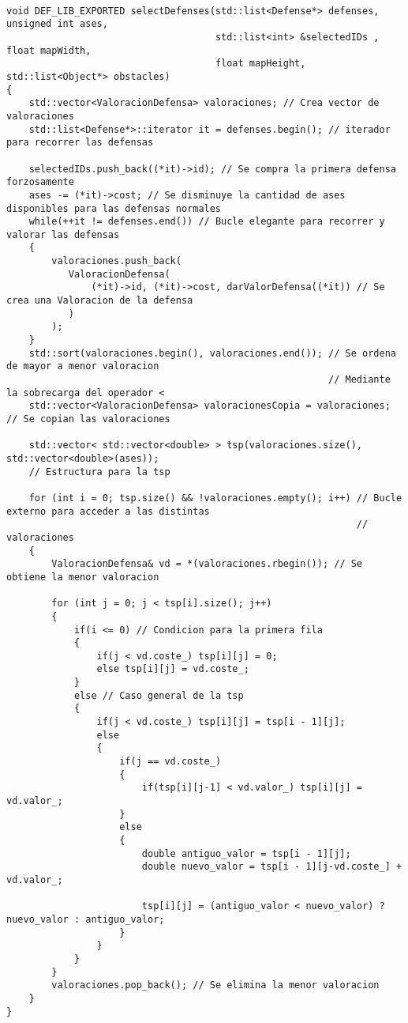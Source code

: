 \lstset{language=C++, texcl=true}
\begin{lstlisting}[frame=single]

void DEF_LIB_EXPORTED selectDefenses(std::list<Defense*> defenses, unsigned int ases,
                                     std::list<int> &selectedIDs , float mapWidth,
                                     float mapHeight, std::list<Object*> obstacles)
{
    std::vector<ValoracionDefensa> valoraciones; // Crea vector de valoraciones
    std::list<Defense*>::iterator it = defenses.begin(); // iterador para recorrer las defensas
    
    selectedIDs.push_back((*it)->id); // Se compra la primera defensa forzosamente
    ases -= (*it)->cost; // Se disminuye la cantidad de ases disponibles para las defensas normales
    while(++it != defenses.end()) // Bucle elegante para recorrer y valorar las defensas
    {
        valoraciones.push_back(
           ValoracionDefensa(
               (*it)->id, (*it)->cost, darValorDefensa((*it)) // Se crea una Valoracion de la defensa
           )
        );
    }
    std::sort(valoraciones.begin(), valoraciones.end()); // Se ordena de mayor a menor valoracion
                                                         // Mediante la sobrecarga del operador <
    std::vector<ValoracionDefensa> valoracionesCopia = valoraciones; // Se copian las valoraciones
    
    std::vector< std::vector<double> > tsp(valoraciones.size(), std::vector<double>(ases));
    // Estructura para la tsp
    
    for (int i = 0; tsp.size() && !valoraciones.empty(); i++) // Bucle externo para acceder a las distintas
                                                              // valoraciones
    {
        ValoracionDefensa& vd = *(valoraciones.rbegin()); // Se obtiene la menor valoracion
        
        for (int j = 0; j < tsp[i].size(); j++)
        {
            if(i <= 0) // Condicion para la primera fila
            {
                if(j < vd.coste_) tsp[i][j] = 0;
                else tsp[i][j] = vd.coste_;
            }
            else // Caso general de la tsp
            {
                if(j < vd.coste_) tsp[i][j] = tsp[i - 1][j];
                else
                {
                    if(j == vd.coste_)
                    {
                        if(tsp[i][j-1] < vd.valor_) tsp[i][j] = vd.valor_;
                    }
                    else
                    {
                        double antiguo_valor = tsp[i - 1][j];
                        double nuevo_valor = tsp[i - 1][j-vd.coste_] + vd.valor_;
                        
                        tsp[i][j] = (antiguo_valor < nuevo_valor) ? nuevo_valor : antiguo_valor;
                    }
                }
            }
        }
        valoraciones.pop_back(); // Se elimina la menor valoracion
    }
}
\end{lstlisting}
